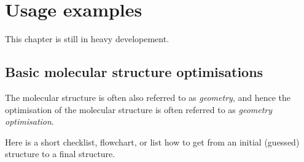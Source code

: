 \documentclass[   %
  final,          %
  a4paper         %
]{article}
\begin{document}
\section{Usage examples}

This chapter is still in heavy developement.

\subsection{Basic molecular structure optimisations}

The molecular structure is often also referred to as \emph{geometry},
and hence the optimisation of the molecular structure is often referred
to as \emph{geometry optimisation}.

Here is a short checklist, flowchart, or list how to get from an initial
(guessed) structure to a final structure.
\end{document}
